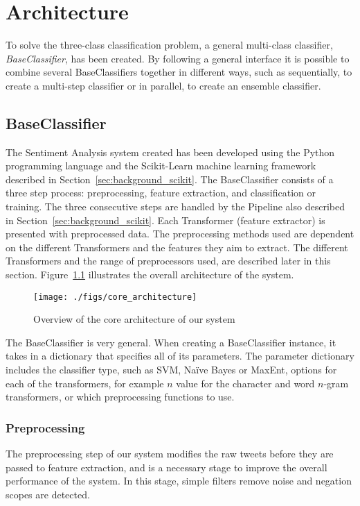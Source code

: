 \chapter{Architecture}
\label{cha:architecture}
To solve the three-class classification problem, a general multi-class classifier, \textit{BaseClassifier}, has been created. By following a general interface it is possible to combine several BaseClassifiers together in different ways, such as sequentially, to create a multi-step classifier or in parallel, to create an ensemble classifier.


\section{BaseClassifier}
\label{sec:core_architecture}
The Sentiment Analysis system created has been developed using the Python programming language and the Scikit-Learn machine learning framework described in Section~\ref{sec:background_scikit}. The BaseClassifier consists of a three step process: preprocessing, feature extraction, and classification or training. The three consecutive steps are handled by the Pipeline also described in Section~\ref{sec:background_scikit}. Each Transformer (feature extractor) is presented with preprocessed data. The preprocessing methods used are dependent on the different Transformers and the features they aim to extract. The different Transformers and the range of preprocessors used, are described later in this section. Figure~\ref{fig:core_architecture} illustrates the overall architecture of the system. \\

\begin{figure}[t]
    \begin{center}
        \texttt{[image: ./figs/core\_architecture]}
    \end{center}
    \caption{Overview of the core architecture of our system}
    \label{fig:core_architecture}
\end{figure}

The BaseClassifier is very general. When creating a BaseClassifier instance, it takes in a dictionary that specifies all of its parameters. The parameter dictionary includes the classifier type, such as SVM, Naïve Bayes or MaxEnt, options for each of the transformers, for example $n$ value for the character and word $n$-gram transformers, or which preprocessing functions to use.

\subsection{Preprocessing}
The preprocessing step of our system modifies the raw tweets before they are passed to feature extraction, and is a necessary stage to improve the overall performance of the system. In this stage, simple filters remove noise and negation scopes are detected.

